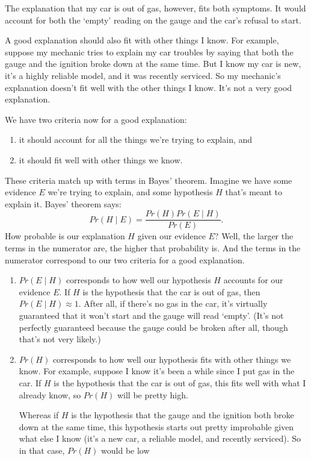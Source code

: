 \documentclass[justified]{tufte-book}
\providecommand{\tightlist}{%
  \setlength{\itemsep}{0pt}\setlength{\parskip}{0pt}}
\newcommand{\given}{\mid}
\newcommand{\p}{Pr}
\theoremstyle{definition}
\theoremstyle{definition}
\theoremstyle{definition}
\theoremstyle{remark}
\begin{document}
The explanation that my car is out of gas, however, fits both symptoms.
It would account for both the `empty' reading on the gauge and the car's
refusal to start.

A good explanation should also fit with other things I know. For
example, suppose my mechanic tries to explain my car troubles by saying
that both the gauge and the ignition broke down at the same time. But I
know my car is new, it's a highly reliable model, and it was recently
serviced. So my mechanic's explanation doesn't fit well with the other
things I know. It's not a very good explanation.

We have two criteria now for a good explanation:

\begin{enumerate}
\def\labelenumi{\arabic{enumi}.}
\tightlist
\item
  it should account for all the things we're trying to explain, and
\item
  it should fit well with other things we know.
\end{enumerate}

These criteria match up with terms in Bayes' theorem. Imagine we have
some evidence \(E\) we're trying to explain, and some hypothesis \(H\)
that's meant to explain it. Bayes' theorem says:
\[ \p(H \given E) = \frac{\p(H)\p(E \given H)}{\p(E)}. \] How probable
is our explanation \(H\) given our evidence \(E\)? Well, the larger the
terms in the numerator are, the higher that probability is. And the
terms in the numerator correspond to our two criteria for a good
explanation.

\begin{enumerate}
\def\labelenumi{\arabic{enumi}.}
\item
  \(\p(E \given H)\) corresponds to how well our hypothesis \(H\)
  accounts for our evidence \(E\). If \(H\) is the hypothesis that the
  car is out of gas, then \(\p(E \given H) \approx 1\). After all, if
  there's no gas in the car, it's virtually guaranteed that it won't
  start and the gauge will read `empty'. (It's not perfectly guaranteed
  because the gauge could be broken after all, though that's not very
  likely.)
\item
  \(\p(H)\) corresponds to how well our hypothesis fits with other
  things we know. For example, suppose I know it's been a while since I
  put gas in the car. If \(H\) is the hypothesis that the car is out of
  gas, this fits well with what I already know, so \(\p(H)\) will be
  pretty high.

  Whereas if \(H\) is the hypothesis that the gauge and the ignition
  both broke down at the same time, this hypothesis starts out pretty
  improbable given what else I know (it's a new car, a reliable model,
  and recently serviced). So in that case, \(\p(H)\) would be low
\end{enumerate}
\end{document}
